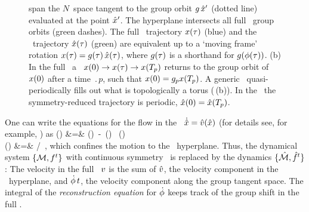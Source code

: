 \documentclass[aip,cha,reprint,
secnumarabic,
nofootinbib, tightenlines,
nobibnotes, showkeys, showpacs,
groupedaddress
]{revtex4-1}
\begin{document}
\begin{figure}
{span the $N$\dmn\ space tangent to the group orbit $g\,{\hat{x}'}$
(dotted line) evaluated at the {\template} point ${\hat{x}'}$. The
hyperplane intersects {all} full \statesp\ group orbits (green
dashes).  The full \statesp\
trajectory $x(\tau)$ (blue) and the \reducedsp\ trajectory
$\hat{x}(\tau)$ (green) are equivalent up to a `moving frame' rotation
$x(\tau)=g(\tau)\,\hat{x}(\tau)$, where $g(\tau)$ is a
shorthand for $g({\bf \phi}(\tau))$.
(b)
In the full \statesp\ a \rpo\ $x(0) \to x(\tau) \to
x({T_{p}})$ returns to the group orbit of $x(0)$ after a time
$\period{p}$,  such that $x(0)=g _p  x
({T_{p}})$. A generic \rpo\ quasi-\-periodically fills out what is
topologically a torus (\reffig{fig:CLf01group}\,(b)). In the \slice\
the symmetry-reduced trajectory is periodic, $\hat{x}(0) =
\hat{x}({T_{p}})$.
 }\label{fig:slice}
 \end{figure}

One can write the equations for the flow in the \reducedsp\
$\dot{\hat{x}} = \hat{v}(\hat{x})$ (for details see, for example,
) as
\bea
\velRed(\sspRed) &=& \vel(\sspRed)
     \,-\, \dot{\gSpace}(\sspRed) \, \groupTan(\sspRed)
\label{EqMotMFrame}\\
\dot{\gSpace}(\sspRed) &=& \braket{\vel(\sspRed)}{\sliceTan{}}
                       /\braket{\groupTan(\sspRed)}{\sliceTan{}}
\,,
\label{reconstrEq}
\eea
which confines the motion to the \slice\ hyperplane. Thus, the dynamical
system $\{{\cal M},f^t\}$ with continuous symmetry \Group\ is replaced by
the {\reducedsp} dynamics $\{\hat{\cal M},\hat{f}^t\}$: The velocity in the
full \statesp\ $v$ is the sum of $\hat{v}$, the velocity component in
the \slice\ hyperplane, and $\dot{{\bf \phi}}\,t$, the velocity
component along the group tangent space. The integral of the {\em
reconstruction equation} for $\dot{{\bf \phi}}$ keeps track of the group
shift in the full \statesp.
\end{document}
